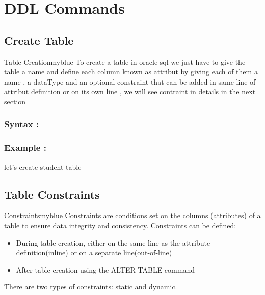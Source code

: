 \newpage
\section{DDL Commands}
\subsection{Create Table}
\begin{prettyBox}{Table Creation}{myblue}
To create a table in oracle sql we just have to give the table a name and define each column known as attribut
by giving each of them a name , a dataType and an optional constraint that can be added in same line of
attribut definition or on its own line , we will see contraint in details in the next section
\end{prettyBox}

\vspace{0.5cm}
\subsubsection*{\underline{Syntax :}}




\vspace{0.5cm}
\subsubsection*{Example :} let's create student table 



\subsection{Table Constraints}

\begin{prettyBox}{Constraints}{myblue}
Constraints are conditions set on the columns (attributes) of a table to ensure data integrity and consistency. Constraints can be defined:
\begin{itemize}
    \item During table creation, either on the same line as the attribute definition(inline) or on a separate line(out-of-line)
    \item After table creation using the ALTER TABLE command
\end{itemize}

There are two types of constraints: static and dynamic.
\end{prettyBox}

